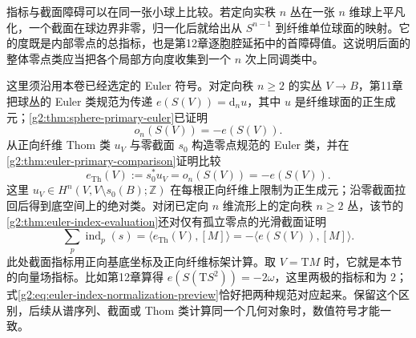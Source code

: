 \ProseParagraphBreak

指标与截面障碍可以在同一张小球上比较。若定向实秩 \(n\) 丛在一张 \(n\) 维球上平凡化，一个截面在球边界非零，归一化后就给出从 \(S^{n-1}\) 到纤维单位球面的映射。它的度既是内部零点的总指标，也是第12章逐胞腔延拓中的首障碍值。这说明后面的整体零点类应当把各个局部方向度收集到一个 \(n\) 次上同调类中。

\ProseParagraphBreak

这里须沿用本卷已经选定的 Euler 符号。对定向秩 \(n\ge2\) 的实丛 \(V\to B\)，第11章把球丛的 Euler 类规范为传递 \(e(S(V))=\mathrm d_nu\)，其中 \(u\) 是纤维球面的正生成元；\cref{g2:thm:sphere-primary-euler}已证明
\[
	o_n(S(V))=-e(S(V)).
\]
从正向纤维 Thom 类 \(u_V\) 与零截面 \(s_0\) 构造零点规范的 Euler 类，并在\cref{g2:thm:euler-primary-comparison}证明比较
\begin{equation}\label{g2:eq:euler-index-normalization-preview}
	e_{\mathrm{Th}}(V):=s_0^*u_V=o_n(S(V))=-e(S(V)).
\end{equation}
这里 \(u_V\in H^n(V,V\setminus s_0(B);\mathbb Z)\) 在每根正向纤维上限制为正生成元；沿零截面拉回后得到底空间上的绝对类。对闭已定向 \(n\) 维流形上的定向秩 \(n\ge2\) 丛，该节的\cref{g2:thm:euler-index-evaluation}还对仅有孤立零点的光滑截面证明
\[
	\sum_p\operatorname{ind}_p(s)
	=\langle e_{\mathrm{Th}}(V),[M]\rangle
	=-\langle e(S(V)),[M]\rangle.
\]
此处截面指标用正向基底坐标及正向纤维标架计算。取 \(V=\mathrm TM\) 时，它就是本节的向量场指标。比如第12章算得 \(e(S(\mathrm TS^2))=-2\omega\)，这里两极的指标和为 \(2\)；式\eqref{g2:eq:euler-index-normalization-preview}恰好把两种规范对应起来。保留这个区别，后续从谱序列、截面或 Thom 类计算同一个几何对象时，数值符号才能一致。
